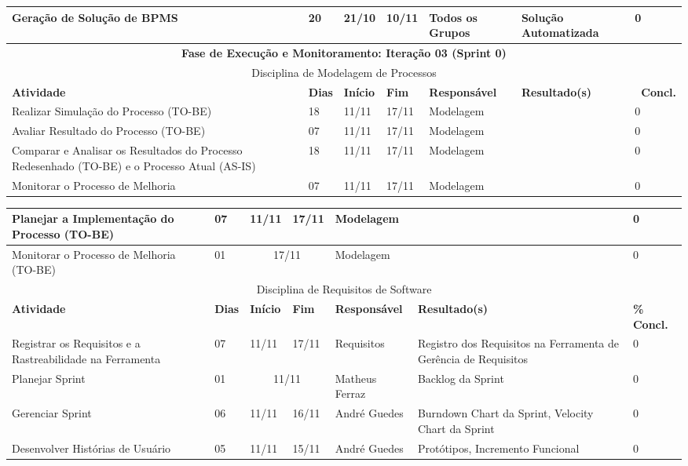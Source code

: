\begin{landscape}
\begin{center}
\begin{tabular}{|m{6cm}|m{1cm}|m{1cm}|m{1cm}|m{4cm}|m{6cm}|m{2cm}|}
			Geração de Solução de BPMS & 20 & 21/10 & 10/11 & Todos os Grupos & Solução Automatizada & 0 \\ \hline
			\multicolumn{7}{|c|}{\textbf{Fase de Execução e Monitoramento: Iteração 03 (Sprint 0)}} \\
			\hline
			\multicolumn{7}{|c|}{Disciplina de Modelagem de Processos} \\
			\hline
			\textbf{Atividade} & \textbf{Dias} & \textbf{Início} & \textbf{Fim} & \textbf{Responsável} & \textbf{Resultado(s)} & \textbf{\ Concl.} \\ \hline
			Realizar Simulação do Processo (TO-BE) & 18 & 11/11 & 17/11 & Modelagem & & 0 \\ \hline
			Avaliar Resultado do Processo (TO-BE) & 07 & 11/11 & 17/11 & Modelagem & & 0 \\ \hline
			Comparar e Analisar os Resultados do Processo Redesenhado (TO-BE) e o Processo Atual (AS-IS) & 18 & 11/11 & 17/11 & Modelagem & & 0 \\ \hline
			Monitorar o Processo de Melhoria & 07 & 11/11 & 17/11 & Modelagem & & 0 \\ \hline
			\end{tabular}
		\end{center}
		\begin{center}
			\begin{tabular}{|m{6cm}|m{1cm}|m{1cm}|m{1cm}|m{4cm}|m{6cm}|m{2cm}|}
			\hline
			Planejar a Implementação do Processo (TO-BE) & 07 & 11/11 & 17/11 & Modelagem & & 0 \\ \hline
			Monitorar o Processo de Melhoria (TO-BE) & 01 & \multicolumn{2}{c|}{17/11} & Modelagem & & 0 \\ \hline
			\multicolumn{7}{|c|}{Disciplina de Requisitos de Software} \\
			\hline
			\textbf{Atividade} & \textbf{Dias} & \textbf{Início} & \textbf{Fim} & \textbf{Responsável} & \textbf{Resultado(s)} & \textbf{\% Concl.} \\ \hline
			Registrar os Requisitos e a Rastreabilidade na Ferramenta & 07 & 11/11 & 17/11 & Requisitos & Registro dos Requisitos na Ferramenta de Gerência de Requisitos & 0 \\ \hline
			Planejar Sprint & 01 & \multicolumn{2}{c|}{11/11} & Matheus Ferraz & Backlog da Sprint & 0 \\ \hline
			Gerenciar Sprint & 06 & 11/11 & 16/11 & André Guedes & Burndown Chart da Sprint, Velocity Chart da Sprint & 0 \\ \hline
			Desenvolver Histórias de Usuário & 05 & 11/11 & 15/11 & André Guedes & Protótipos, Incremento Funcional & 0 \\ \hline

\end{tabular}
\end{center}
\end{landscape}
